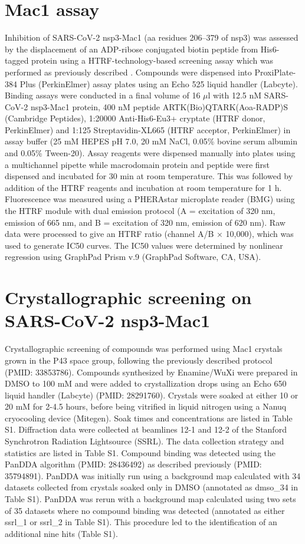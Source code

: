 \section{Mac1 assay}
Inhibition of SARS-CoV-2 nsp3-Mac1 (aa residues 206–379 of nsp3) was assessed by the displacement of an ADP-ribose conjugated biotin peptide from His6-tagged protein using a HTRF-technology-based screening assay which was performed as previously described \cite{Schuller2021Mac1Frag}. Compounds were dispensed into ProxiPlate-384 Plus (PerkinElmer) assay plates using an Echo 525 liquid handler (Labcyte). Binding assays were conducted in a final volume of 16 $\mu$l with 12.5 nM SARS-CoV-2 nsp3-Mac1 protein, 400 nM peptide ARTK(Bio)QTARK(Aoa-RADP)S (Cambridge Peptides), 1:20000 Anti-His6-Eu3+ cryptate (HTRF donor, PerkinElmer) and 1:125 Streptavidin-XL665 (HTRF acceptor, PerkinElmer) in assay buffer (25 mM HEPES pH 7.0, 20 mM NaCl, 0.05\% bovine serum albumin and 0.05\% Tween-20). Assay reagents were dispensed manually into plates using a multichannel pipette while macrodomain protein and peptide were first dispensed and incubated for 30 min at room temperature. This was followed by addition of the HTRF reagents and incubation at room temperature for 1 h. Fluorescence was measured using a PHERAstar microplate reader (BMG) using the HTRF module with dual emission protocol (A = excitation of 320 nm, emission of 665 nm, and B = excitation of 320 nm, emission of 620 nm). Raw data were processed to give an HTRF ratio (channel A/B $\times$ 10,000), which was used to generate IC50 curves. The IC50 values were determined by nonlinear regression using GraphPad Prism v.9 (GraphPad Software, CA, USA).

\section{Crystallographic screening on SARS-CoV-2 nsp3-Mac1}
Crystallographic screening of compounds was performed using Mac1 crystals grown in the P43 space group, following the previously described protocol (PMID: 33853786). Compounds synthesized by Enamine/WuXi were prepared in DMSO to 100 mM and were added to crystallization drops using an Echo 650 liquid handler (Labcyte) (PMID: 28291760). Crystals were soaked at either 10 or 20 mM for 2-4.5 hours, before being vitrified in liquid nitrogen using a Nanuq cryocooling device (Mitegen). Soak times and concentrations are listed in Table S1. Diffraction data were collected at beamlines 12-1 and 12-2 of the Stanford Synchrotron Radiation Lightsource (SSRL). The data collection strategy and statistics are listed in Table S1. Compound binding was detected using the PanDDA algorithm (PMID: 28436492) as described previously (PMID: 35794891). PanDDA was initially run using a background map calculated with 34 datasets collected from crystals soaked only in DMSO (annotated as dmso\_34 in Table S1). PanDDA was rerun with a background map calculated using two sets of 35 datasets where no compound binding was detected (annotated as either ssrl\_1 or ssrl\_2 in Table S1). This procedure led to the identification of an additional nine hits (Table S1). 


